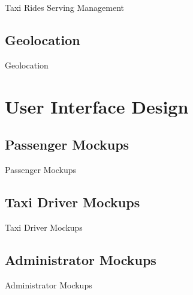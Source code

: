 \documentclass{../common/latex_classes/pdf_presentation}
\begin{document}
	\begin{frame}{Taxi Rides Serving Management}
	\end{frame}
	
	\subsection{Geolocation}
	
	\begin{frame}{Geolocation}
	\end{frame}
	
	\section{User Interface Design}
	
	\subsection{Passenger Mockups}
	
	\begin{frame}{Passenger Mockups}
	\end{frame}
	
	\subsection{Taxi Driver Mockups}
	
	\begin{frame}{Taxi Driver Mockups}
	\end{frame}
	
	\subsection{Administrator Mockups}
	
	\begin{frame}{Administrator Mockups}
	\end{frame}
	
\end{document}
